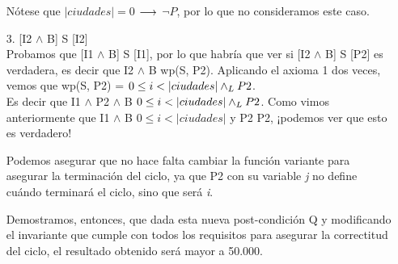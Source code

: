 \documentclass[10pt,a4paper]{article}
\begin{document}
\begin{enumerate}
Nótese que $|ciudades| = 0$ $\longrightarrow$ $\neg P$, por lo que no consideramos este caso.\\

\item[3.] [I2 $\wedge$ B] S [I2]\\

Probamos que [I1 $\wedge$ B] S [I1], por lo que habría que ver si [I2 $\wedge$ B] S [P2] es verdadera, es decir que I2 $\wedge$ B \implica wp(S, P2). Aplicando el axioma 1 dos veces, vemos que wp(S, P2) = $0 \leq i < |ciudades| \land _L P2$. \\

Es decir que I1 $\wedge$ P2 $\wedge$ B \implica $0 \leq i < |ciudades| \land _L P2$. Como vimos anteriormente que I1 $\wedge$ B \implica $0 \leq i < |ciudades|$ y P2 \implica P2, ¡podemos ver que esto es verdadero!

Podemos asegurar que no hace falta cambiar la función variante para asegurar la terminación del ciclo, ya que P2 con su variable \textit{j} no define cuándo terminará el ciclo, sino que será \textit{i}.

Demostramos, entonces, que dada esta nueva post-condición Q y modificando el invariante que cumple con todos los requisitos para asegurar la correctitud del ciclo, el resultado obtenido será mayor a 50.000.
\end{enumerate}
\end{document}
